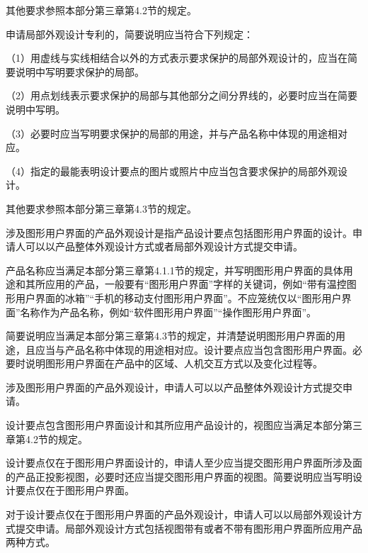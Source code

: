 其他要求参照本部分第三章第4.2节的规定。

申请局部外观设计专利的，简要说明应当符合下列规定：

{\setlength{\parindent}{17.1bp}（1）用虚线与实线相结合以外的方式表示要求保护的局部外观设计的，应当在简要说明中写明要求保护的局部。\par}

{\setlength{\parindent}{17.1bp}（2）用点划线表示要求保护的局部与其他部分之间分界线的，必要时应当在简要说明中写明。\par}

{\setlength{\parindent}{17.1bp}（3）必要时应当写明要求保护的局部的用途，并与产品名称中体现的用途相对应。\par}

{\setlength{\parindent}{17.1bp}（4）指定的最能表明设计要点的图片或照片中应当包含要求保护的局部外观设计。\par}

其他要求参照本部分第三章第4.3节的规定。

涉及图形用户界面的产品外观设计是指产品设计要点包括图形用户界面的设计。申请人可以以产品整体外观设计方式或者局部外观设计方式提交申请。

产品名称应当满足本部分第三章第4.1.1节的规定，并写明图形用户界面的具体用途和其所应用的产品，一般要有“图形用户界面”字样的关键词，例如“带有温控图形用户界面的冰箱”“手机的移动支付图形用户界面”。不应笼统仅以“图形用户界面”名称作为产品名称，例如“软件图形用户界面”“操作图形用户界面”。

简要说明应当满足本部分第三章第4.3节的规定，并清楚说明图形用户界面的用途，且应当与产品名称中体现的用途相对应。设计要点应当包含图形用户界面。必要时说明图形用户界面在产品中的区域、人机交互方式以及变化过程等。

涉及图形用户界面的产品外观设计，申请人可以以产品整体外观设计方式提交申请。

设计要点包含图形用户界面设计和其所应用产品设计的，视图应当满足本部分第三章第4.2节的规定。

设计要点仅在于图形用户界面设计的，申请人至少应当提交图形用户界面所涉及面的产品正投影视图，必要时还应当提交图形用户界面的视图。简要说明应当写明设计要点仅在于图形用户界面。

对于设计要点仅在于图形用户界面的产品外观设计，申请人可以以局部外观设计方式提交申请。局部外观设计方式包括视图带有或者不带有图形用户界面所应用产品两种方式。

